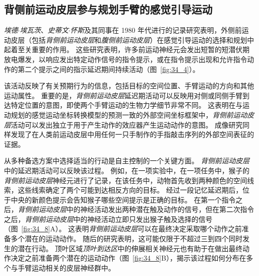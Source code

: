 \subsection{背侧前运动皮层参与规划手臂的感觉引导运动}

\textit{埃德$\cdot$埃瓦茨}、\textit{史蒂文$\cdot$怀斯}及其同事在 1980 年代进行的记录研究表明，外侧前运动皮层（包括\textit{背侧前运动皮层}和\textit{腹侧前运动皮层}）在感觉引导运动的选择和规划中起着至关重要的作用。
这些研究表明，许多前运动神经元会发出短暂的短潜伏期放电爆发，以响应发出特定动作信号的指令提示，或在指令提示出现和允许指令动作的第二个提示之间的指示延迟期间持续活动（图~\ref{fig:34_4}）。


该活动反映了有关预期行为的信息，包括目标的空间位置、手臂运动的方向和其他运动属性。
重要的是，\textit{背侧前运动皮层}延迟期活动可以反映用对侧或同侧手臂到达特定位置的意图，即使两个手臂运动的生物力学细节非常不同。
这表明在与运动规划的感觉运动坐标转换模型的预测一致的外部空间坐标框架中，\textit{背侧前运动皮层}活动可以发出独立于用于产生动作的效应器产生运动动作的意图。
成像研究同样发现了在人类前运动皮层中用任何一只手制作的手指敲击序列的外部空间表征的证据。


从多种备选方案中选择适当的行动是自主控制的一个关键方面。
\textit{背侧前运动皮层}中的延迟期活动可以反映该过程。
例如，在一项实验中，在一项任务中，猴子的\textit{背侧前运动皮层}神经元进行了记录，在该任务中，动物首先收到两种颜色的空间线索，这些线索确定了两个可能到达相反方向的目标。 
经过一段记忆延迟期后，位于中央的新颜色提示会告知猴子哪些空间提示是正确的目标。
在第一个指令之后，\textit{背侧前运动皮层}中的神经活动发出两种潜在触及动作的信号，但在第二次指令之后，\textit{背侧前运动皮层}中的神经活动立即只发出猴子触及选择的信号（图~\ref{fig:34_8}A）。
这表明\textit{背侧前运动皮层}可以在最终决定采取哪个动作之前准备多个潜在的运动动作。
随后的研究表明，这可能仅限于不超过三到四个同时发生的潜在行动。
顶叶区域\textit{顶叶到达区}中的伸展相关神经元也有助于在做出最终动作决定之前准备两个潜在的运动动作（图~\ref{fig:34_8}B），揭示该过程如何分布在多个与手臂运动相关的皮层神经群中。


